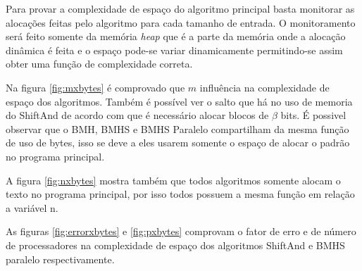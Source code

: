 \documentclass[11pt]{article}
\begin{document}
Para provar a complexidade de espaço do algoritmo principal basta monitorar as alocações feitas pelo algoritmo para cada tamanho de entrada. O monitoramento será feito somente da memória \emph{heap} \cite{osthreeeasypieces} que é a parte da memória onde a alocação dinâmica é feita e o espaço pode-se variar dinamicamente permitindo-se assim obter uma função de complexidade correta.

Na figura \ref{fig:mxbytes} é comprovado que \(m\) influência na complexidade de espaço dos algoritmos. Também é possível ver o salto que há no uso de memoria do ShiftAnd de acordo com que é necessário alocar blocos de \(\beta\) bits. É possivel observar que o BMH, BMHS e BMHS Paralelo compartilham da mesma função de uso de bytes, isso se deve a eles usarem somente o espaço de alocar o padrão no programa principal.

A figura \ref{fig:nxbytes} mostra também que todos algoritmos somente alocam o texto no programa principal, por isso todos possuem a mesma função em relação a variável n.

As figuras \ref{fig:errorxbytes} e \ref{fig:pxbytes} comprovam o fator de erro e de número de processadores na complexidade de espaço dos algoritmos ShiftAnd e BMHS paralelo respectivamente.
\end{document}
